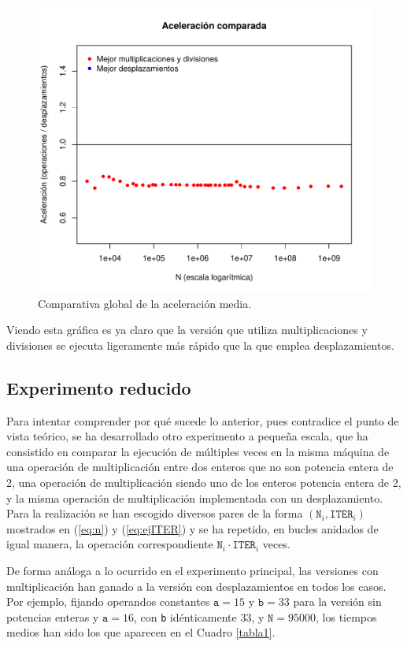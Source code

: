 \documentclass[11pt,a4paper,twoside]{article}
\theoremstyle{definition}
\begin{document}
	\begin{figure} [H] \centering
		\includegraphics[width=.8\textwidth]{../graficas/NOCHE_speedup.pdf}
		\caption{Comparativa global de la aceleración media.}
		\label{graf:speedup}
	\end{figure}

	Viendo esta gráfica es ya claro que la versión que utiliza multiplicaciones y divisiones se ejecuta ligeramente más rápido que la que emplea desplazamientos.
	
	\subsection{Experimento reducido}
	
	Para intentar comprender por qué sucede lo anterior, pues contradice el punto de vista teórico, se ha desarrollado otro experimento a pequeña escala, que ha consistido en comparar la ejecución de múltiples veces en la misma máquina de una operación de multiplicación entre dos enteros que no son potencia entera de 2, una operación de multiplicación siendo uno de los enteros potencia entera de 2, y la misma operación de multiplicación implementada con un desplazamiento. Para la realización se han escogido diversos pares de la forma $(\texttt{N}_i, \texttt{ITER}_i)$ mostrados en (\ref{eq:n}) y (\ref{eq:ejITER}) y se ha repetido, en bucles anidados de igual manera, la operación correspondiente $\texttt{N}_i\cdot \texttt{ITER}_i$ veces.
	
	De forma análoga a lo ocurrido en el experimento principal, las versiones con multiplicación han ganado a la versión con desplazamientos en todos los casos. Por ejemplo, fijando operandos constantes $\texttt{a}=15$ y $\texttt{b}=33$ para la versión sin potencias enteras y $\texttt{a}=16$, con \texttt{b} idénticamente 33, y $\texttt{N}=95000$, los tiempos medios han sido los que aparecen en el Cuadro \ref{tabla1}.
	
\end{document}

